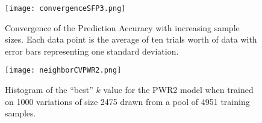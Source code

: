 \begin{figure}[!htbp]
	\centering
	\texttt{[image: convergenceSFP3.png]}
	\caption{Convergence of the Prediction Accuracy with increasing sample sizes. Each data point is the average of ten trials
	worth of data with error bars representing one standard deviation.}
	\label{fig:romConvergence}
\end{figure}

\begin{figure}[!htbp]
	\centering
	\texttt{[image: neighborCVPWR2.png]}
	\caption{Histogram of the ``best'' $k$ value for the PWR2 model when trained on 1000 variations of size 2475 drawn from a pool of 4951 training samples. }
	\label{fig:neighborSelection}
\end{figure}